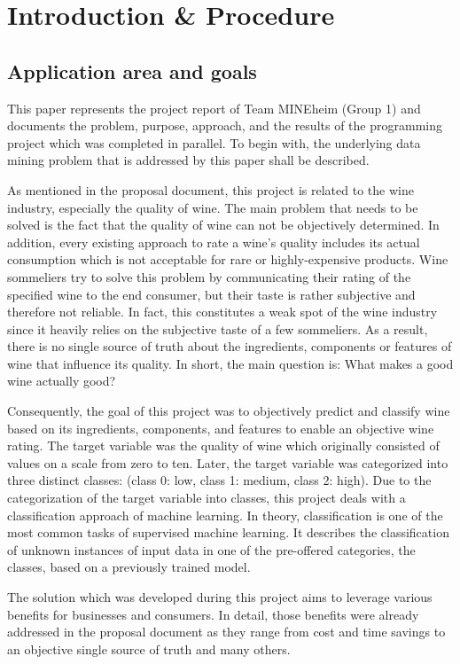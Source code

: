 \chapter{Introduction \& Procedure}
\section{Application area and goals}


This paper represents the project report of Team MINEheim (Group 1) and documents the problem, purpose, approach, and the results of the programming project which was completed in parallel. To begin with, the underlying data mining problem that is addressed by this paper shall be described.

As mentioned in the proposal document, this project is related to the wine industry, especially the quality of wine. The main problem that needs to be solved is the fact that the quality of wine can not be objectively determined. In addition, every existing approach to rate a wine's quality includes its actual consumption which is not acceptable for rare or highly-expensive products. Wine sommeliers try to solve this problem by communicating their rating of the specified wine to the end consumer, but their taste is rather subjective and therefore not reliable. In fact, this constitutes a weak spot of the wine industry since it heavily relies on the subjective taste of a few sommeliers. As a result, there is no single source of truth about the ingredients, components or features of wine that influence its quality. In short, the main question is: What makes a good wine actually good?

Consequently, the goal of this project was to objectively predict and classify wine based on its ingredients, components, and features to enable an objective wine rating. The target variable was the quality of wine which originally consisted of values on a scale from zero to ten. Later, the target variable was categorized into three distinct classes: (class 0: low, class 1: medium, class 2: high). Due to the categorization of the target variable into classes, this project deals with a classification approach of machine learning. In theory, classification is one of the most common tasks of supervised machine learning. It describes the classification of unknown instances of input data in one of the pre-offered categories, the classes, based on a previously trained model. \citep{Novakovic2010}

The solution which was developed during this project aims to leverage various benefits for businesses and consumers. In detail, those benefits were already addressed in the proposal document as they range from cost and time savings to an objective single source of truth and many others. 